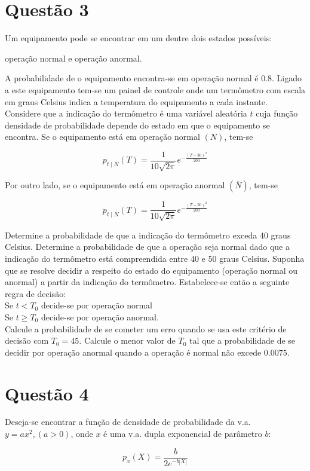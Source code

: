 \documentclass[a5paper]{report}
\begin{document}
\section*{Questão 3}
Um equipamento pode se encontrar em um dentre dois estados possíveis:

operação normal e operação anormal. 

A probabilidade de o equipamento encontra-se em operação normal é $0.8$. Ligado a este equipamento tem-se um painel de controle onde um termômetro com escala em graus Celsius indica a temperatura do equipamento a cada instante. Considere que a indicação do termômetro é uma variável aleatória $t$ cuja função densidade de probabilidade depende do estado em que o equipamento se encontra. Se o equipamento está em operação normal $(N)$, tem-se

\[p_{t \mid N}(T) = \frac{1}{10\sqrt{2\pi}} e^{-\frac{(T - 30)^2}{200}}\]

Por outro lado, se o equipamento está em operação anormal $(\overline{N})$, tem-se

\[p_{t \mid \overline{N}}(T) = \frac{1}{10\sqrt{2\pi}} e^{-\frac{(T - 50)^2}{200}}\]

Determine a probabilidade de que a indicação do termômetro exceda 40 graus Celsius.
Determine a probabilidade de que a operação seja normal dado que a indicação do
termômetro está compreendida entre 40 e 50 graus Celsius. 
Suponha que se resolve decidir a respeito do estado do equipamento (operação normal ou anormal) a partir da
indicação do termômetro. Estabelece-se então a seguinte regra de decisão:\\
Se $t < T_0$ decide-se por operação normal\\
Se $t \geq T_0$ decide-se por operação anormal.\\
Calcule a probabilidade de se cometer um erro quando se usa este critério de decisão com
$T_0 = 45$. Calcule o menor valor de $T_0$ tal que a probabilidade de se decidir por operação
anormal quando a operação é normal não excede $0.0075$.

\section*{Questão 4}
Deseja-se encontrar a função de densidade de probabilidade da v.a. $y = ax^2, (a > 0)$, onde $x$ é uma v.a. dupla exponencial de parâmetro $b$:

\[p_x(X) = \frac{b}{2e^{-b|X|}}\]
\end{document}
